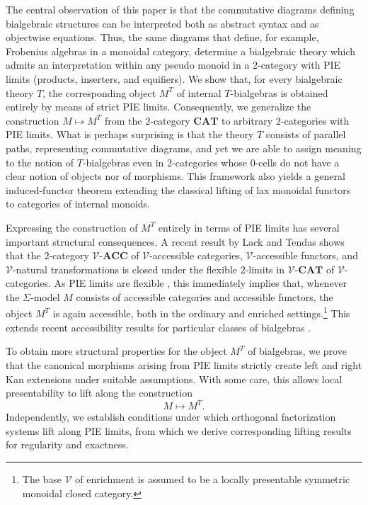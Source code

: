 \documentclass[11pt]{article}
\theoremstyle{plain}
\theoremstyle{definition}
\numberwithin{equation}{section}
\newcommand{\CAT}{\mathbf{CAT}}
\newcommand{\ACC}{\mathbf{ACC}}
\newcommand{\V}{\mathcal{V}}
\begin{document}
The central observation of this paper is that the commutative diagrams defining bialgebraic structures can be interpreted both as abstract syntax and as objectwise equations. Thus, the same diagrams that define, for example, Frobenius algebras in a monoidal category, determine a bialgebraic theory which admits an interpretation within any pseudo monoid in a $2$-category with PIE limits (products, inserters, and equifiers). We show that, for every bialgebraic theory $T$, the corresponding object $M^T$ of internal $T$-bialgebras is obtained entirely by means of strict PIE limits. Consequently, we generalize the construction $M\mapsto M^T$ from the $2$-category $\CAT$ to arbitrary $2$-categories with PIE limits. What is perhaps surprising is that the theory $T$ consists of parallel paths, representing commutative diagrams, and yet we are able to assign meaning to the notion of $T$-bialgebras even in $2$-categories whose $0$-cells do not have a clear notion of objects nor of morphisms. This framework also yields a general induced-functor theorem extending the classical lifting of lax monoidal functors to categories of internal monoids.

Expressing the construction of $M^T$ entirely in terms of PIE limits has several important structural consequences. A recent result by Lack and Tendas \cite[Theorem~5.5.]{LACK2023107196} shows that the $2$-category $\V$-$\ACC$ of $\V$-accessible categories, $\V$-accessible functors, and $\V$-natural transformations is closed under the flexible $2$-limits in $\V$-$\CAT$ of $\V$-categories. As PIE limits are flexible \cite{PowerPIE1991}, this immediately implies that, whenever the $\Sigma$-model $M$ consists of accessible categories and accessible functors, the object $M^T$ is again accessible, both in the ordinary and enriched settings.\footnote{The base $\V$ of enrichment is assumed to be a locally presentable symmetric monoidal closed category.} This extends recent accessibility results for particular classes of bialgebras \cite{agore2025categoryhopfbraces, PorstHopfLocallyPresentable, Porst01062008}.

To obtain more structural properties for the object $M^T$ of bialgebras, we prove that the canonical morphisms arising from PIE limits strictly create left and right Kan extensions under suitable assumptions. With some care, this allows local presentability to lift along the construction
$$
M \longmapsto M^T.
$$
Independently, we establish conditions under which orthogonal factorization systems lift along PIE limits, from which we derive corresponding lifting results for regularity and exactness.
\end{document}
